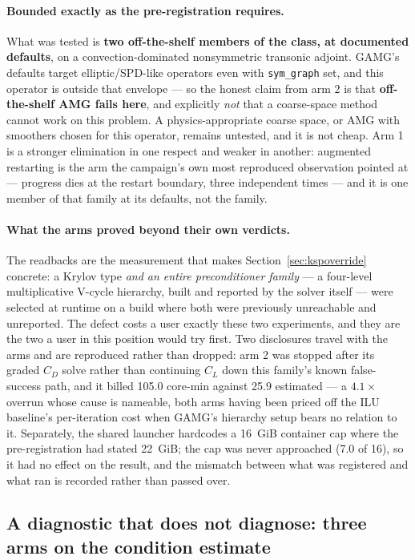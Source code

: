 \documentclass[11pt,a4paper]{article}
\begin{document}
\paragraph{Bounded exactly as the pre-registration requires.} What was tested is \textbf{two
off-the-shelf members of the class, at documented defaults}, on a convection-dominated
nonsymmetric transonic adjoint. GAMG's defaults target elliptic/SPD-like operators even with
\texttt{sym\_graph} set, and this operator is outside that envelope --- so the honest claim from
arm 2 is that \textbf{off-the-shelf AMG fails here}, and explicitly \emph{not} that a coarse-space
method cannot work on this problem. A physics-appropriate coarse space, or AMG with smoothers
chosen for this operator, remains untested, and it is not cheap. Arm 1 is a stronger elimination
in one respect and weaker in another: augmented restarting is the arm the campaign's own most
reproduced observation pointed at --- progress dies at the restart boundary, three independent
times --- and it is one member of that family at its defaults, not the family.

\paragraph{What the arms proved beyond their own verdicts.} The readbacks are the measurement that
makes Section~\ref{sec:kspoverride} concrete: a Krylov type \emph{and an entire preconditioner
family} --- a four-level multiplicative V-cycle hierarchy, built and reported by the solver itself
--- were selected at runtime on a build where both were previously unreachable and unreported. The
defect costs a user exactly these two experiments, and they are the two a user in this position
would try first. Two disclosures travel with the arms and are reproduced rather than dropped: arm
2 was stopped after its graded \(C_D\) solve rather than continuing \(C_L\) down this family's
known false-success path, and it billed 105.0 core-min against 25.9 estimated --- a \(4.1\times\)
overrun whose cause is nameable, both arms having been priced off the ILU baseline's
per-iteration cost when GAMG's hierarchy setup bears no relation to it. Separately, the shared
launcher hardcodes a 16~GiB container cap where the pre-registration had stated 22~GiB; the cap
was never approached (7.0 of 16), so it had no effect on the result, and the mismatch between
what was registered and what ran is recorded rather than passed over.

\subsection{A diagnostic that does not diagnose: three arms on the condition estimate}
\label{sec:kappainstr}
\end{document}
